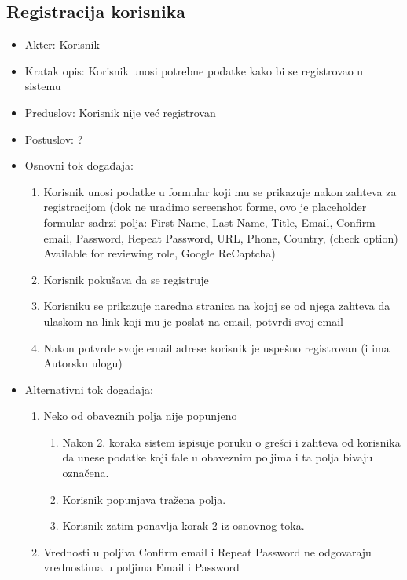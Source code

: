 \documentclass[a4paper]{article}
\begin{document}
\subsection{Registracija korisnika}
\begin{itemize}
    \item Akter: Korisnik
    \item Kratak opis: Korisnik unosi potrebne podatke kako bi se registrovao u sistemu
    \item Preduslov: Korisnik nije već registrovan
    \item Postuslov: ?
    \item Osnovni tok događaja:
        \begin{enumerate}
            \item Korisnik unosi podatke u formular koji mu se prikazuje nakon zahteva za registracijom (dok ne uradimo screenshot forme, ovo je placeholder formular sadrzi polja: First Name, Last Name, Title, Email, Confirm email, Password, Repeat Password, URL, Phone, Country, (check option) Available for reviewing role, Google ReCaptcha)
            \item Korisnik pokušava da se registruje
            \item Korisniku se prikazuje naredna stranica na kojoj se od njega zahteva da ulaskom na link koji mu je poslat na email, potvrdi svoj email
            \item Nakon potvrde svoje email adrese korisnik je uspešno registrovan (i ima Autorsku ulogu)
        \end{enumerate}
    \item Alternativni tok događaja:
        \begin{enumerate}
            \item Neko od obaveznih polja nije popunjeno
                \begin{enumerate}
                    \item Nakon 2. koraka sistem ispisuje poruku o grešci i zahteva od korisnika da unese podatke koji fale u obaveznim poljima i ta polja bivaju označena.
                    \item Korisnik popunjava tražena polja.
                    \item Korisnik zatim ponavlja korak 2 iz osnovnog toka.
                \end{enumerate}
            \item Vrednosti u poljiva Confirm email i Repeat Password ne odgovaraju vrednostima u poljima Email i Password
                \begin{enumerate}

\end{enumerate}
\end{enumerate}
\end{itemize}
\end{document}
